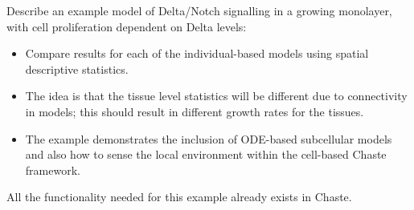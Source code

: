 \documentclass{article}
\begin{document}
\noindent Describe an example model of Delta/Notch signalling in a growing monolayer, with cell proliferation dependent on Delta levels:
\begin{itemize}
\item Compare results for each of the individual-based models using spatial descriptive statistics.
\item The idea is that the tissue level statistics will be different due to connectivity in models; this should result in different growth rates for the tissues.
\item The example demonstrates the inclusion of ODE-based subcellular models and also how to sense the local environment within the cell-based Chaste framework.
\end{itemize}

\noindent All the functionality needed for this example already exists in Chaste.
\end{document}
